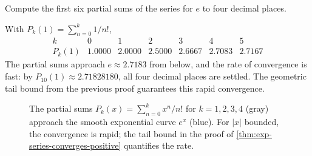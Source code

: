 \begin{workedexample}
\begin{example}\label{ex:partial-sum-e}
Compute the first six partial sums of the series for \(e\) to four decimal places.
\end{example}

\begin{solution}
With \(P_{k}(1) = \sum_{n = 0}^{k} 1/n!\),
\[
\begin{array}{c|cccccc}
k & 0 & 1 & 2 & 3 & 4 & 5 \\ \hline
P_{k}(1) & 1.0000 & 2.0000 & 2.5000 & 2.6667 & 2.7083 & 2.7167
\end{array}
\]
The partial sums approach \(e \approx 2.7183\) from below, and the rate of convergence is fast: by \(P_{10}(1) \approx 2.71828180\), all four decimal places are settled. The geometric tail bound from the previous proof guarantees this rapid convergence.
\end{solution}
\end{workedexample}

\begin{figure}[H]
\centering
{}
\caption{The partial sums \(P_{k}(x) = \sum_{n = 0}^{k} x^{n}/n!\) for \(k = 1, 2, 3, 4\) (gray) approach the smooth exponential curve \(e^{x}\) (blue). For \(\lvert x \rvert\) bounded, the convergence is rapid; the tail bound in the proof of \cref{thm:exp-series-converges-positive} quantifies the rate.}
\label{fig:exp-partial-sums}
\end{figure}

